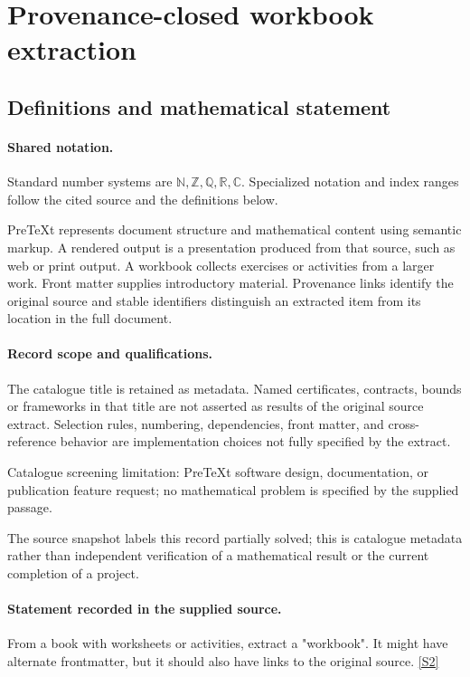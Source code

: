 \documentclass[11pt]{article}
\newcommand{\sref}[2]{\hyperlink{source:#1:#2}{[S#2]}}
\begin{document}
\section{Provenance-closed workbook extraction}\label{statement}

\subsection{Definitions and mathematical statement}

\paragraph{Shared notation.}Standard number systems are $\mathbb N,\mathbb Z,\mathbb Q,\mathbb R,\mathbb C$. Specialized notation and index ranges follow the cited source and the definitions below.


PreTeXt represents document structure and mathematical content using semantic markup. A rendered output is a presentation produced from that source, such as web or print output. A workbook collects exercises or activities from a larger work. Front matter supplies introductory material. Provenance links identify the original source and stable identifiers distinguish an extracted item from its location in the full document.
\paragraph{Record scope and qualifications.}
The catalogue title is retained as metadata. Named certificates, contracts, bounds or frameworks in that title are not asserted as results of the original source extract.
Selection rules, numbering, dependencies, front matter, and cross-reference behavior are implementation choices not fully specified by the extract.

Catalogue screening limitation: PreTeXt software design, documentation, or publication feature request; no mathematical problem is specified by the supplied passage.

The source snapshot labels this record partially solved; this is catalogue metadata rather than independent verification of a mathematical result or the current completion of a project.
\paragraph{Statement recorded in the supplied source.}
From a book with worksheets or activities, extract a "workbook". It might have alternate frontmatter, but it should also have links to the original source. \sref{statement}{2}
\end{document}
